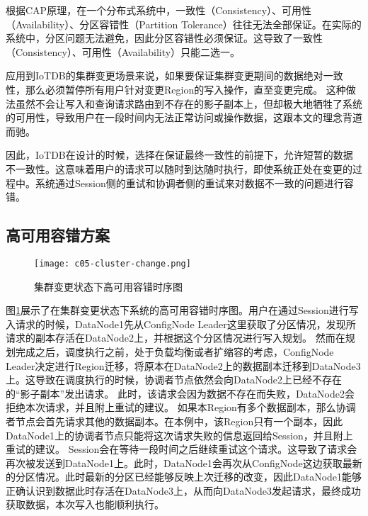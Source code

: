 根据CAP原理\cite{fox1999harvest}，在一个分布式系统中，一致性（Consistency）、可用性（Availability）、分区容错性（Partition Tolerance）往往无法全部保证。在实际的系统中，分区问题无法避免，因此分区容错性必须保证。这导致了一致性（Consistency）、可用性（Availability）只能二选一。

应用到IoTDB的集群变更场景来说，如果要保证集群变更期间的数据绝对一致性，那么必须暂停所有用户针对变更Region的写入操作，直至变更完成。
这种做法虽然不会让写入和查询请求路由到不存在的影子副本上，但却极大地牺牲了系统的可用性，导致用户在一段时间内无法正常访问或操作数据，这跟本文的理念背道而驰。

因此，IoTDB在设计的时候，选择在保证最终一致性的前提下，允许短暂的数据不一致性。这意味着用户的请求可以随时到达随时执行，即使系统正处在变更的过程中。系统通过Session侧的重试和协调者侧的重试来对数据不一致的问题进行容错。


\subsection{高可用容错方案}

\begin{figure}
    \centering
    \texttt{[image: c05-cluster-change.png]}
    \caption{集群变更状态下高可用容错时序图}
    \label{fig:c05-cluster-change}
\end{figure}

图\ref{fig:c05-cluster-change}展示了在集群变更状态下系统的高可用容错时序图。用户在通过Session进行写入请求的时候，DataNode1先从ConfigNode Leader这里获取了分区情况，发现所请求的副本存活在DataNode2上，并根据这个分区情况进行写入规划。
然而在规划完成之后，调度执行之前，处于负载均衡或者扩缩容的考虑，ConfigNode Leader决定进行Region迁移，将原本在DataNode2上的数据副本迁移到DataNode3上。这导致在调度执行的时候，协调者节点依然会向DataNode2上已经不存在的“影子副本”发出请求。
此时，该请求会因为数据不存在而失败，DataNode2会拒绝本次请求，并且附上重试的建议。
如果本Region有多个数据副本，那么协调者节点会首先请求其他的数据副本。在本例中，该Region只有一个副本，因此DataNode1上的协调者节点只能将这次请求失败的信息返回给Session，并且附上重试的建议。
Session会在等待一段时间之后继续重试这个请求。这导致了请求会再次被发送到DataNode1上。此时，DataNode1会再次从ConfigNode这边获取最新的分区情况。此时最新的分区已经能够反映上次迁移的改变，因此DataNode1能够正确认识到数据此时存活在DataNode3上，从而向DataNode3发起请求，最终成功获取数据，本次写入也能顺利执行。
